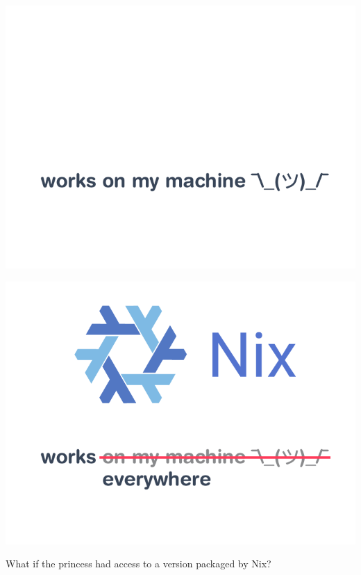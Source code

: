 \documentclass[aspectratio=169]{beamer}
\begin{document}
\begin{frame}
     {
        \begin{center}
            \includegraphics[height=0.98\textheight]{img/schema-nix-motto-pre.pdf}
        \end{center}
    }
     {
        \begin{center}
            \includegraphics[height=0.98\textheight]{img/schema-nix-motto.pdf}
        \end{center}
    }
\end{frame}

\begin{frame}
What if the princess had access to a version packaged by Nix?
\end{frame}
\end{document}
